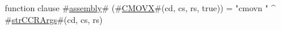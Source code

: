 function clause #\hyperref[sailMIPSzassembly]{assembly}# (#\hyperref[sailMIPSzCMOVX]{CMOVX}#(cd, cs, rs, true)) = "cmovn " ^ #\hyperref[sailMIPSzstrCCRArgs]{strCCRArgs}#(cd, cs, rs)
